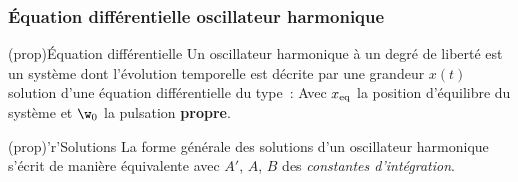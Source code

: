 \documentclass[../../main/main.tex]{subfiles}
\begin{document}
\subsubsection{Équation différentielle oscillateur harmonique}

\begin{tcbraster}[raster columns=2, raster equal height=rows]
	\begin{tcb}[label=prop:eqdiffoh](prop){Équation différentielle}
		Un oscillateur harmonique à un degré de liberté est un système dont
		l'évolution temporelle est décrite par une grandeur $x(t)$ solution
		d’une équation différentielle du type~:
		\psw{
		\[
			\boxed{ \dv[2]{x}{t} + \w_0{}^2x = \w_0{}^2x_{\rm eq}}
		\]
		}
		Avec $x_{\rm eq}$ la position d'équilibre du système et $\w_0$ la
		pulsation \textbf{propre}.
	\end{tcb}
	\begin{tcb}[label=prop:soluoh](prop)'r'{Solutions}
		La forme générale des solutions d'un oscillateur harmonique s'écrit de
		manière équivalente
		avec $A'$, $A$, $B$ des \textit{constantes d'intégration}.
	\end{tcb}
\end{tcbraster}
\end{document}
